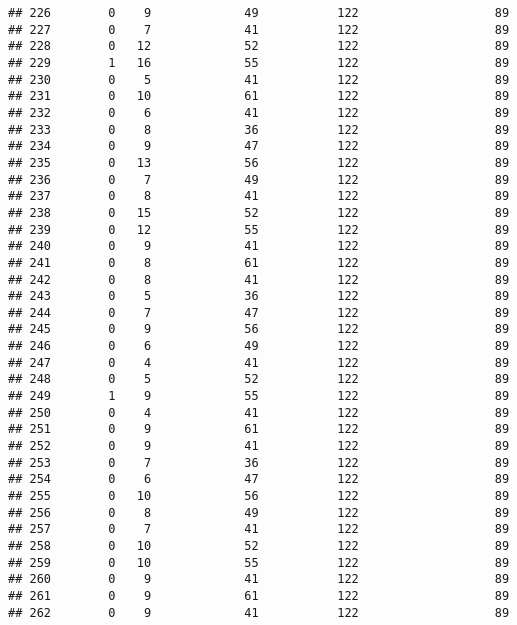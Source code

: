\documentclass[]{article}
\begin{document}
\begin{verbatim}
## 226        0    9             49           122                   89
## 227        0    7             41           122                   89
## 228        0   12             52           122                   89
## 229        1   16             55           122                   89
## 230        0    5             41           122                   89
## 231        0   10             61           122                   89
## 232        0    6             41           122                   89
## 233        0    8             36           122                   89
## 234        0    9             47           122                   89
## 235        0   13             56           122                   89
## 236        0    7             49           122                   89
## 237        0    8             41           122                   89
## 238        0   15             52           122                   89
## 239        0   12             55           122                   89
## 240        0    9             41           122                   89
## 241        0    8             61           122                   89
## 242        0    8             41           122                   89
## 243        0    5             36           122                   89
## 244        0    7             47           122                   89
## 245        0    9             56           122                   89
## 246        0    6             49           122                   89
## 247        0    4             41           122                   89
## 248        0    5             52           122                   89
## 249        1    9             55           122                   89
## 250        0    4             41           122                   89
## 251        0    9             61           122                   89
## 252        0    9             41           122                   89
## 253        0    7             36           122                   89
## 254        0    6             47           122                   89
## 255        0   10             56           122                   89
## 256        0    8             49           122                   89
## 257        0    7             41           122                   89
## 258        0   10             52           122                   89
## 259        0   10             55           122                   89
## 260        0    9             41           122                   89
## 261        0    9             61           122                   89
## 262        0    9             41           122                   89

\end{verbatim}
\end{document}

